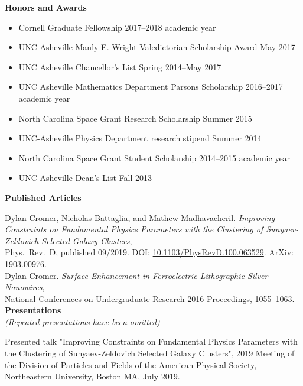 \documentclass[letterpaper, 11pt]{article}
\newcommand{\noi}{\noindent}
\newcommand{\ind}{\indent}
\begin{document}
\noi \textbf{Honors and Awards}
\begin{itemize}[leftmargin=*]
	\item Cornell Graduate Fellowship \hfill 2017--2018 academic year

	\item UNC Asheville Manly E. Wright Valedictorian Scholarship Award \hfill May 2017

	\item UNC Asheville Chancellor's List \hfill Spring 2014--May 2017

	\item UNC Asheville Mathematics Department Parsons Scholarship \hfill 2016--2017 academic year

	\item North Carolina Space Grant Research Scholarship \hfill Summer 2015 

	\item UNC-Asheville Physics Department research stipend \hfill Summer 2014

	\item North Carolina Space Grant Student Scholarship \hfill 2014--2015 academic year

	\item UNC Asheville Dean's List \hfill Fall 2013

\end{itemize}


\noi \textbf{Published Articles}

\noi Dylan Cromer, Nicholas Battaglia, and Mathew Madhavacheril. \emph{Improving Constraints on Fundamental Physics Parameters with the Clustering of Sunyaev-Zeldovich Selected Galaxy Clusters},
\\
\ind Phys.\ Rev.\ D, published 09/2019. DOI: \href{https://doi.org/10.1103/PhysRevD.100.063529}{10.1103/PhysRevD.100.063529}. ArXiv: \href{https://arxiv.org/abs/1903.00976}{1903.00976}.
\\

\noi Dylan Cromer. \emph{Surface Enhancement in Ferroelectric Lithographic Silver Nanowires}, 
\\
	\ind National Conferences on Undergraduate Research 2016 Proceedings, 1055--1063.
\\

\noi \textbf{Presentations}
\\
\emph{(Repeated presentations have been omitted)}

\noi Presented talk "Improving Constraints on Fundamental Physics Parameters with the Clustering of Sunyaev-Zeldovich Selected Galaxy Clusters", 2019 Meeting of the Division of Particles and Fields of the American Physical Society, Northeastern University, Boston MA, July 2019.
\end{document}
